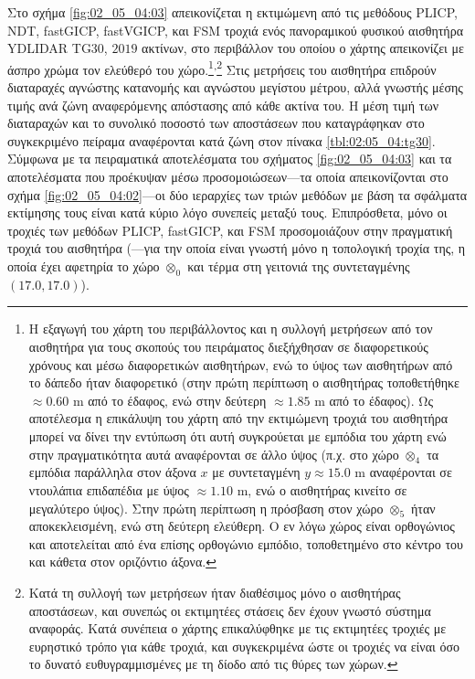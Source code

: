 Στο σχήμα \ref{fig:02_05_04:03} απεικονίζεται η εκτιμώμενη από τις μεθόδους
PLICP, NDT, fastGICP, fastVGICP, και FSM τροχιά ενός πανοραμικού φυσικού
αισθητήρα YDLIDAR TG30, $2019$ ακτίνων, στο περιβάλλον του οποίου ο χάρτης
απεικονίζει με άσπρο χρώμα τον ελεύθερό του χώρο.\footnote{Η εξαγωγή του χάρτη
του περιβάλλοντος και η συλλογή μετρήσεων από τον αισθητήρα για τους σκοπούς
του πειράματος διεξήχθησαν σε διαφορετικούς χρόνους και μέσω διαφορετικών
αισθητήρων, ενώ το ύψος των αισθητήρων από το δάπεδο ήταν διαφορετικό (στην
πρώτη περίπτωση ο αισθητήρας τοποθετήθηκε $\approx 0.60$ m από το έδαφος, ενώ
στην δεύτερη $\approx 1.85$ m από το έδαφος). Ως αποτέλεσμα η επικάλυψη του
χάρτη από την εκτιμώμενη τροχιά του αισθητήρα μπορεί να δίνει την εντύπωση ότι
αυτή συγκρούεται με εμπόδια του χάρτη ενώ στην πραγματικότητα αυτά αναφέρονται
σε άλλο ύψος (π.χ. στο χώρο $\otimes_4$ τα εμπόδια παράλληλα στον άξονα $x$ με
συντεταγμένη $y \approx 15.0$ m αναφέρονται σε ντουλάπια επιδαπέδια με ύψος
$\approx 1.10$ m, ενώ ο αισθητήρας κινείτο σε μεγαλύτερο ύψος). Στην πρώτη
περίπτωση η πρόσβαση στον χώρο $\otimes_5$ ήταν αποκεκλεισμένη, ενώ στη δεύτερη
ελεύθερη.  Ο εν λόγω χώρος είναι ορθογώνιος και αποτελείται από ένα επίσης
ορθογώνιο εμπόδιο, τοποθετημένο στο κέντρο του και κάθετα στον οριζόντιο
άξονα.}\textsuperscript{,}\footnote{Κατά τη συλλογή των μετρήσεων ήταν
διαθέσιμος μόνο ο αισθητήρας αποστάσεων, και συνεπώς οι εκτιμητέες στάσεις δεν
έχουν γνωστό σύστημα αναφοράς. Κατά συνέπεια ο χάρτης επικαλύφθηκε με τις
εκτιμητέες τροχιές με ευρηστικό τρόπο για κάθε τροχιά, και συγκεκριμένα ώστε οι
τροχιές να είναι όσο το δυνατό ευθυγραμμισμένες με τη δίοδο από τις θύρες των
χώρων.} Στις μετρήσεις του αισθητήρα επιδρούν διαταραχές αγνώστης κατανομής και
αγνώστου μεγίστου μέτρου, αλλά γνωστής μέσης τιμής ανά ζώνη αναφερόμενης
απόστασης από κάθε ακτίνα του. Η μέση τιμή των διαταραχών και το συνολικό
ποσοστό των αποστάσεων που καταγράφηκαν στο συγκεκριμένο πείραμα αναφέρονται
κατά ζώνη στον πίνακα \ref{tbl:02:05_04:tg30}.  Σύμφωνα με τα πειραματικά
αποτελέσματα του σχήματος \ref{fig:02_05_04:03} και τα αποτελέσματα που
προέκυψαν μέσω προσομοιώσεων---τα οποία απεικονίζονται στο σχήμα
\ref{fig:02_05_04:02}---οι δύο ιεραρχίες των τριών μεθόδων με βάση τα σφάλματα
εκτίμησης τους είναι κατά κύριο λόγο συνεπείς μεταξύ τους.  Επιπρόσθετα, μόνο
οι τροχιές των μεθόδων PLICP, fastGICP, και FSM προσομοιάζουν στην πραγματική
τροχιά του αισθητήρα (---για την οποία είναι γνωστή μόνο η τοπολογική τροχία
της, η οποία έχει αφετηρία το χώρο $\otimes_0$ και τέρμα στη γειτονιά της
συντεταγμένης $(17.0, 17.0)$).


